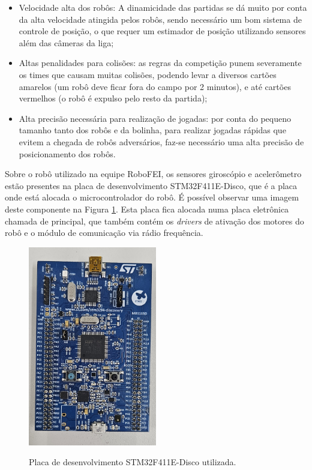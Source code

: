\documentclass[acronym, symbols, table]{fei}
\begin{document}
		\begin{itemize}
			\item Velocidade alta dos robôs: A dinamicidade das partidas se dá muito por conta da alta velocidade atingida pelos robôs, sendo necessário um bom sistema de controle de posição, o que requer um estimador de posição utilizando sensores além das câmeras da liga;
			
			\item Altas penalidades para colisões: as regras da competição punem severamente os times que causam muitas colisões, podendo levar a diversos cartões amarelos (um robô deve ficar fora do campo por 2 minutos), e até cartões vermelhos (o robô é expulso pelo resto da partida);
			
			\item Alta precisão necessária para realização de jogadas: por conta do pequeno tamanho tanto dos robôs e da bolinha, para realizar jogadas rápidas que evitem a chegada de robôs adversários, faz-se necessário uma alta precisão de posicionamento dos robôs.
		\end{itemize}
		
		Sobre o robô utilizado na equipe RoboFEI, os sensores giroscópio e acelerômetro estão presentes na placa de desenvolvimento STM32F411E-Disco, que é a placa onde está alocada o microcontrolador do robô. É possível observar uma imagem deste componente na Figura \ref{fig:stm32f411}. Esta placa fica alocada numa placa eletrônica chamada de principal, que também contém os \textit{drivers} de ativação dos motores do robô e o módulo de comunicação via rádio frequência.
		
		\begin{figure}[!htb]
			\centering
			\caption{Placa de desenvolvimento STM32F411E-Disco utilizada.}
			\includegraphics[width=0.5\textwidth]{stm32f411.jpg}
			\label{fig:stm32f411}
		\end{figure}
		
\end{document}
